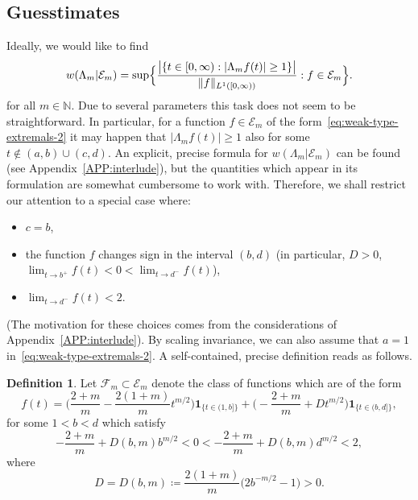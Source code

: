 \documentclass[a4paper]{amsart} %
\theoremstyle{definition}
\newtheorem{definition}[theorem]{Definition}
\theoremstyle{remark}
\numberwithin{equation}{section}
\newcommand*{\LongArxivOrShortJournalVersion}[2]{#1}
\newcommand*{\NNone}{\mathbb{N}}
\newcommand*{\ind}[1]{\mathbf{1}_{#1}}
\newcommand*{\indbr}[1]{\ind{\{#1\}}}
\newcommand*{\weakconstrestricted}[2]{w(#1|#2)} %
\newcommand*{\fclass}[1]{\mathcal{E}_{#1}}
\newcommand*{\fclassspec}[1]{\mathcal{F}_{#1}}
\newcommand*{\dOne}{D}%
\begin{document}
\subsection{Guesstimates}

\label{sec:guesstimates}


Ideally,
we would like to find 
\[
\weakconstrestricted{\Lambda_m}{\fclass{m}}
=
\sup\Bigl\{ \frac{
	\bigl|\{t\in[0,\infty) : |\Lambda_m f(t)|\geq 1\} \bigr|}{\|f\|_{L^1([0, \infty))}} :
f\in\fclass{m}\Bigr\}.
\]
for all $m\in\NNone$.
Due to several parameters this task does not seem to be straightforward.
In particular, 
for a function $f\in\fclass{m}$ of the form~\eqref{eq:weak-type-extremals-2} 
it may happen that 
$|\Lambda_m f (t)| \geq 1$ 
also for some $t\notin (a,b) \cup (c,d)$.
An explicit, precise formula 
for $\weakconstrestricted{\Lambda_m}{\fclass{m}}$
can be found (see \LongArxivOrShortJournalVersion{Appendix~\ref{APP:interlude}}{Appendix~C in the arXiv version of this paper}),
but the quantities which appear in its formulation
 are somewhat cumbersome to work with.
Therefore,
we shall restrict our attention to a special case where:
\begin{itemize} 
\item $c=b$,
\item the function $f$ changes sign in the interval $(b,d)$ (in particular, $\dOne >0$, $\lim_{t\to b^+} f(t) < 0 < \lim_{t\to d^-} f(t)$),
\item $\lim_{t\to d^-} f(t) <2$.
\end{itemize}
(The motivation for these choices comes from the considerations of  \LongArxivOrShortJournalVersion{Appendix~\ref{APP:interlude}}{Appendix~C in the arXiv version of this paper}).
By scaling invariance, we can also assume that $a=1$ in~\eqref{eq:weak-type-extremals-2}.
A self-contained, precise definition reads as follows.


\begin{definition}
	\label{def:f-class-spec}
	Let $\fclassspec{m}\subset \fclass{m}$ denote the class of functions
	which 
	are of the form
	\[
	f(t) = \bigl(\frac{2+m}{m} -\frac{2(1+m)}{m} t^{m/2}\bigr) \indbr{t\in (1,b]}
	+  \bigl( -\frac{2+m}{m} + \dOne t^{m/2}\bigr)\indbr{t\in(b,d]},
	\]
	for some $1  < b < d$ 	
	which satisfy
	\begin{equation}
	\label{eq:constraint-for-special-b-d}
	-\frac{2+m}{m} + \dOne(b,m) b^{m/2} < 0 <  -\frac{2+m}{m} + \dOne(b,m) d^{m/2} < 2,
	\end{equation}
	where	
	\[
	\dOne = \dOne(b,m) \coloneqq \frac{2(1+m)}{m} \bigl(2 b^{-m/2}  - 1\bigr) > 0.
	\]
\end{definition}
\end{document}
